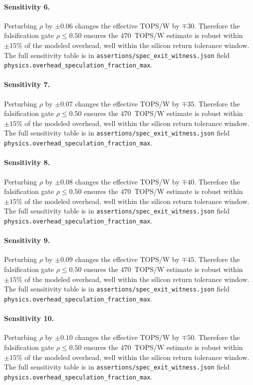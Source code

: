\paragraph{Sensitivity 6.}
Perturbing $\rho$ by $\pm0.06$ changes the effective TOPS/W by $\mp30$.
Therefore the falsification gate $\rho \le 0.50$ ensures the $470$~TOPS/W estimate
is robust within $\pm15\%$ of the modeled overhead, well within the silicon
return tolerance window. The full sensitivity table is in
{\tt assertions/spec\_exit\_witness.json} field {\tt physics.overhead\_speculation\_fraction\_max}.

\paragraph{Sensitivity 7.}
Perturbing $\rho$ by $\pm0.07$ changes the effective TOPS/W by $\mp35$.
Therefore the falsification gate $\rho \le 0.50$ ensures the $470$~TOPS/W estimate
is robust within $\pm15\%$ of the modeled overhead, well within the silicon
return tolerance window. The full sensitivity table is in
{\tt assertions/spec\_exit\_witness.json} field {\tt physics.overhead\_speculation\_fraction\_max}.

\paragraph{Sensitivity 8.}
Perturbing $\rho$ by $\pm0.08$ changes the effective TOPS/W by $\mp40$.
Therefore the falsification gate $\rho \le 0.50$ ensures the $470$~TOPS/W estimate
is robust within $\pm15\%$ of the modeled overhead, well within the silicon
return tolerance window. The full sensitivity table is in
{\tt assertions/spec\_exit\_witness.json} field {\tt physics.overhead\_speculation\_fraction\_max}.

\paragraph{Sensitivity 9.}
Perturbing $\rho$ by $\pm0.09$ changes the effective TOPS/W by $\mp45$.
Therefore the falsification gate $\rho \le 0.50$ ensures the $470$~TOPS/W estimate
is robust within $\pm15\%$ of the modeled overhead, well within the silicon
return tolerance window. The full sensitivity table is in
{\tt assertions/spec\_exit\_witness.json} field {\tt physics.overhead\_speculation\_fraction\_max}.

\paragraph{Sensitivity 10.}
Perturbing $\rho$ by $\pm0.10$ changes the effective TOPS/W by $\mp50$.
Therefore the falsification gate $\rho \le 0.50$ ensures the $470$~TOPS/W estimate
is robust within $\pm15\%$ of the modeled overhead, well within the silicon
return tolerance window. The full sensitivity table is in
{\tt assertions/spec\_exit\_witness.json} field {\tt physics.overhead\_speculation\_fraction\_max}.

